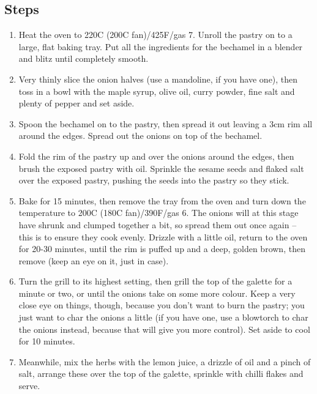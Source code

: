 \documentclass{book}
\begin{document}
\subsection*{Steps}
\begin{enumerate}
\item Heat the oven to 220C (200C fan)/425F/gas 7. Unroll the pastry on to a large, flat baking tray. Put all the ingredients for the bechamel in a blender and blitz until completely smooth.
\item Very thinly slice the onion halves (use a mandoline, if you have one), then toss in a bowl with the maple syrup, olive oil, curry powder, fine salt and plenty of pepper and set aside.
\item Spoon the bechamel on to the pastry, then spread it out leaving a 3cm rim all around the edges. Spread out the onions on top of the bechamel.
\item Fold the rim of the pastry up and over the onions around the edges, then brush the exposed pastry with oil. Sprinkle the sesame seeds and flaked salt over the exposed pastry, pushing the seeds into the pastry so they stick.
\item Bake for 15 minutes, then remove the tray from the oven and turn down the temperature to 200C (180C fan)/390F/gas 6. The onions will at this stage have shrunk and clumped together a bit, so spread them out once again – this is to ensure they cook evenly. Drizzle with a little oil, return to the oven for 20-30 minutes, until the rim is puffed up and a deep, golden brown, then remove (keep an eye on it, just in case).
\item Turn the grill to its highest setting, then grill the top of the galette for a minute or two, or until the onions take on some more colour. Keep a very close eye on things, though, because you don’t want to burn the pastry; you just want to char the onions a little (if you have one, use a blowtorch to char the onions instead, because that will give you more control). Set aside to cool for 10 minutes.
\item Meanwhile, mix the herbs with the lemon juice, a drizzle of oil and a pinch of salt, arrange these over the top of the galette, sprinkle with chilli flakes and serve.
\end{enumerate}
\newpage
\end{document}
